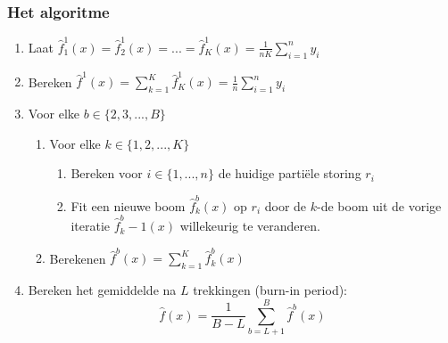 {\subsubsection{Het algoritme}
\begin{enumerate}
    \item Laat $\hat{f}_1^1(x)=\hat{f}_2^1(x)=...=\hat{f}_K^1(x)=\frac{1}{nK}\sum\limits_{i=1}^ny_i$
    \item Bereken $\hat{f}^1(x)=\sum\limits_{k=1}^K\hat{f}_K^1(x)=\frac{1}{n}\sum\limits_{i=1}^ny_i$
    \item Voor elke $b \in \{2,3,...,B\}$
    \begin{enumerate}
        \item Voor elke $k \in \{1,2,...,K\}$
        \begin{enumerate}
            \item Bereken voor $i \in \{1,...,n\}$ de huidige partiële storing $r_i$
            \item Fit een nieuwe boom $\hat{f}_k^b(x)$ op $r_i$ door de $k$-de boom uit de vorige iteratie $\hat{f}_k^b-1(x)$ willekeurig te veranderen.
        \end{enumerate}
        \item Berekenen $\hat{f}^b(x)=\sum\limits_{k=1}^K\hat{f}_k^b(x)$
    \end{enumerate}
    \item Bereken het gemiddelde na $L$ trekkingen (burn-in period):
    \[\hat{f}(x)=\frac{1}{B-L}\sum\limits_{b=L+1}^B\hat{f}^b(x)\]
\end{enumerate}
}
